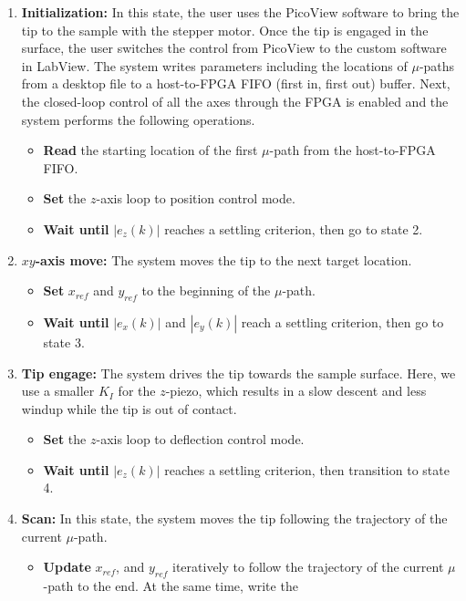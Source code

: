 \documentclass[twocolumn,twoside]{IEEEtran/IEEEtran}
\begin{document}
\begin{enumerate}
\item \textbf{Initialization:} In this state, the user uses the PicoView
  software to bring the tip to the sample with the stepper motor. Once the tip
  is engaged in the surface, the user switches the control from PicoView to the
  custom software in LabView. The system writes parameters including the
  locations of $\mu$-paths from a desktop file to a host-to-FPGA FIFO (first in,
  first out) buffer. Next, the closed-loop control of all the axes through the
  FPGA is enabled and the system performs the following operations.
  \begin{itemize}
  \item \textbf{Read} the starting location of the first $\mu$-path from the
    host-to-FPGA FIFO.
  \item \textbf{Set} the $z$-axis loop to position control mode.
  \item \textbf{Wait until} $|e_z(k)|$ reaches a settling criterion, then go to
    state 2.
  \end{itemize}
\item \textbf{$xy$-axis move:} The system moves the tip to the next target
  location.
  \begin{itemize}
  \item \textbf{Set} $x_{ref}$ and $y_{ref}$ to the beginning of the $\mu$-path.
  \item \textbf{Wait until} $|e_x(k)|$ and $|e_y(k)|$ reach a settling
    criterion, then go to state 3.
  \end{itemize}
\item \textbf{Tip engage:} The system drives the tip towards the sample surface.
  Here, we use a smaller $K_I$ for the $z$-piezo, which results in a slow
  descent and less windup while the tip is out of contact.
  \begin{itemize}
  \item \textbf{Set} the $z$-axis loop to deflection control mode.
  \item \textbf{Wait until} $|e_z(k)|$ reaches a settling criterion, then
    transition to state 4. 
  \end{itemize}
\item \textbf{Scan:} In this state, the system moves the tip following the
  trajectory of the current $\mu$-path.
  \begin{itemize}
  \item \textbf{Update} $x_{ref}$, and $y_{ref}$ iteratively to follow the
    trajectory of the current $\mu$-path to the end. At the same time, write the

\end{itemize}
\end{enumerate}
\end{document}
